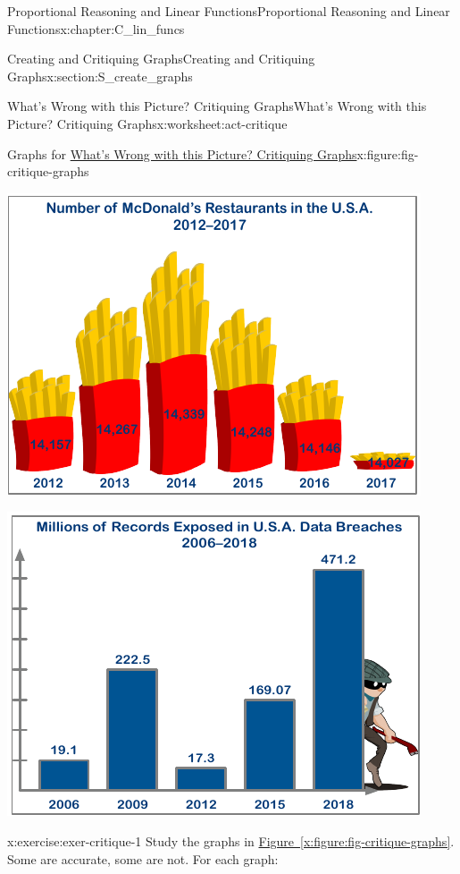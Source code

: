 \documentclass[oneside,10pt,]{book}
\newcommand{\xreffont}{\relax}
\numberwithin{equation}{chapter}
\begin{document}
\begin{chapterptx}{Proportional Reasoning and Linear Functions}{}{Proportional Reasoning and Linear Functions}{}{}{x:chapter:C_lin_funcs}
\begin{sectionptx}{Creating and Critiquing Graphs}{}{Creating and Critiquing Graphs}{}{}{x:section:S_create_graphs}
\begin{worksheet-subsection}{What's Wrong with this Picture? Critiquing Graphs}{}{What's Wrong with this Picture? Critiquing Graphs}{}{}{x:worksheet:act-critique}
\begin{introduction}{}
\begin{figureptx}{Graphs for \hyperref[x:worksheet:act-critique]{What's Wrong with this Picture? Critiquing Graphs}}{x:figure:fig-critique-graphs}{}
\begin{sidebyside}{2}{0}{0}{0}
\begin{sbspanel}{0.5}
\includegraphics[width=\linewidth]{external/critique-graph3.pdf}
\end{sbspanel}%
\begin{sbspanel}{0.5}%
\includegraphics[width=\linewidth]{external/critique-graph4.pdf}
\end{sbspanel}%
\end{sidebyside}%
\tcblower
\end{figureptx}%
\end{introduction}%
\begin{divisionexercise}{1}{}{}{x:exercise:exer-critique-1}%
Study the graphs in \hyperref[x:figure:fig-critique-graphs]{Figure~{\xreffont\ref{x:figure:fig-critique-graphs}}}. Some are accurate, some are not. For each graph:%

\end{divisionexercise}
\end{worksheet-subsection}
\end{sectionptx}
\end{chapterptx}
\end{document}
